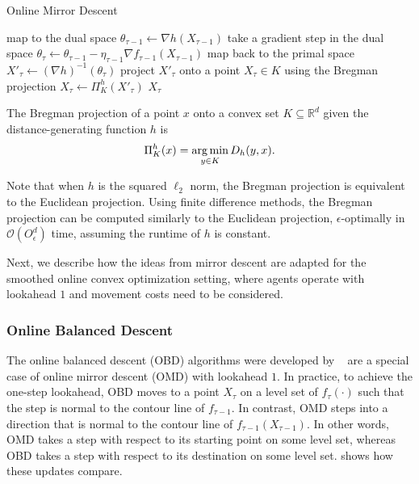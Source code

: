 \begin{algorithm}
    \caption{Online Mirror Descent~\cite{Gupta2020}}\label{alg:md:omd}
    map to the dual space $\theta_{\tau-1} \gets \nabla h (X_{\tau-1})$\;
    take a gradient step in the dual space $\theta_{\tau} \gets \theta_{\tau-1} - \eta_{\tau-1} \nabla f_{\tau-1}(X_{\tau-1})$\;
    map back to the primal space $X'_{\tau} \gets (\nabla h)^{-1}(\theta_{\tau})$\;
    project $X'_{\tau}$ onto a point $X_{\tau} \in K$ using the Bregman projection $X_{\tau} \gets \Pi_K^h(X'_{\tau})$\;
    \Return $X_{\tau}$\;
\end{algorithm}

\begin{definition}
\cite{Gupta2020} The Bregman projection of a point $x$ onto a convex set $K \subseteq \mathbb{R}^d$ given the distance-generating function $h$ is \begin{align*}
    \Pi_K^h(x) = \operatorname*{arg\,min}_{y \in K} D_h(y,x).
\end{align*}
\end{definition}

Note that when $h$ is the squared $\ell_2$ norm, the Bregman projection is equivalent to the Euclidean projection. Using finite difference methods, the Bregman projection can be computed similarly to the Euclidean projection, $\epsilon$-optimally in $\mathcal{O}(O_{\epsilon}^d)$ time, assuming the runtime of $h$ is constant.

Next, we describe how the ideas from mirror descent are adapted for the smoothed online convex optimization setting, where agents operate with lookahead $1$ and movement costs need to be considered.

\subsubsection{Online Balanced Descent}\label{section:online_algorithms:md:descent_methods:obd}

The online balanced descent (OBD) algorithms were developed by \citeauthor*{Goel2018}~\cite{Goel2018} are a special case of online mirror descent (OMD) with lookahead $1$. In practice, to achieve the one-step lookahead, OBD moves to a point $X_{\tau}$ on a level set of $f_{\tau}(\cdot)$ such that the step is normal to the contour line of $f_{\tau-1}$. In contrast, OMD steps into a direction that is normal to the contour line of $f_{\tau-1}(X_{\tau-1})$. In other words, OMD takes a step with respect to its starting point on some level set, whereas OBD takes a step with respect to its destination on some level set.  shows how these updates compare.

